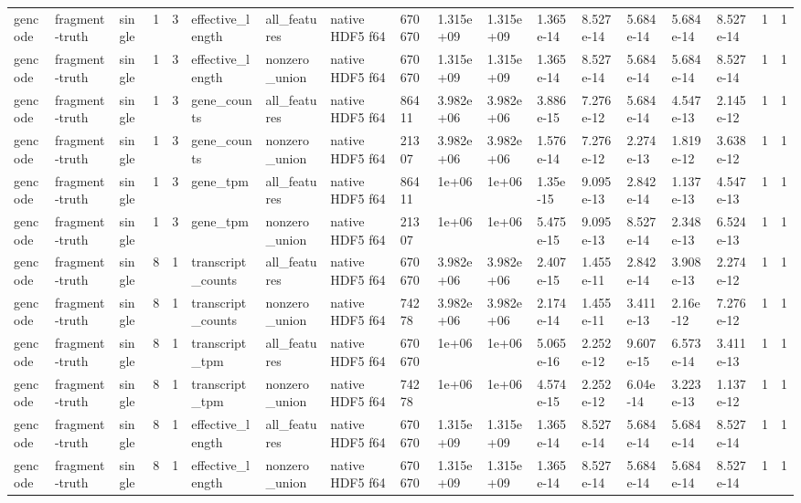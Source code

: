 \begin{tabular}{llllllllllllllllll}
gencode & fragment-truth & single & 1 & 3 & effective\_length & all\_features & native HDF5 f64 & 670670 & 1.315e+09 & 1.315e+09 & 1.365e-14 & 8.527e-14 & 5.684e-14 & 5.684e-14 & 8.527e-14 & 1 & 1 \\
gencode & fragment-truth & single & 1 & 3 & effective\_length & nonzero\_union & native HDF5 f64 & 670670 & 1.315e+09 & 1.315e+09 & 1.365e-14 & 8.527e-14 & 5.684e-14 & 5.684e-14 & 8.527e-14 & 1 & 1 \\
gencode & fragment-truth & single & 1 & 3 & gene\_counts & all\_features & native HDF5 f64 & 86411 & 3.982e+06 & 3.982e+06 & 3.886e-15 & 7.276e-12 & 5.684e-14 & 4.547e-13 & 2.145e-12 & 1 & 1 \\
gencode & fragment-truth & single & 1 & 3 & gene\_counts & nonzero\_union & native HDF5 f64 & 21307 & 3.982e+06 & 3.982e+06 & 1.576e-14 & 7.276e-12 & 2.274e-13 & 1.819e-12 & 3.638e-12 & 1 & 1 \\
gencode & fragment-truth & single & 1 & 3 & gene\_tpm & all\_features & native HDF5 f64 & 86411 & 1e+06 & 1e+06 & 1.35e-15 & 9.095e-13 & 2.842e-14 & 1.137e-13 & 4.547e-13 & 1 & 1 \\
gencode & fragment-truth & single & 1 & 3 & gene\_tpm & nonzero\_union & native HDF5 f64 & 21307 & 1e+06 & 1e+06 & 5.475e-15 & 9.095e-13 & 8.527e-14 & 2.348e-13 & 6.524e-13 & 1 & 1 \\
gencode & fragment-truth & single & 8 & 1 & transcript\_counts & all\_features & native HDF5 f64 & 670670 & 3.982e+06 & 3.982e+06 & 2.407e-15 & 1.455e-11 & 2.842e-14 & 3.908e-13 & 2.274e-12 & 1 & 1 \\
gencode & fragment-truth & single & 8 & 1 & transcript\_counts & nonzero\_union & native HDF5 f64 & 74278 & 3.982e+06 & 3.982e+06 & 2.174e-14 & 1.455e-11 & 3.411e-13 & 2.16e-12 & 7.276e-12 & 1 & 1 \\
gencode & fragment-truth & single & 8 & 1 & transcript\_tpm & all\_features & native HDF5 f64 & 670670 & 1e+06 & 1e+06 & 5.065e-16 & 2.252e-12 & 9.607e-15 & 6.573e-14 & 3.411e-13 & 1 & 1 \\
gencode & fragment-truth & single & 8 & 1 & transcript\_tpm & nonzero\_union & native HDF5 f64 & 74278 & 1e+06 & 1e+06 & 4.574e-15 & 2.252e-12 & 6.04e-14 & 3.223e-13 & 1.137e-12 & 1 & 1 \\
gencode & fragment-truth & single & 8 & 1 & effective\_length & all\_features & native HDF5 f64 & 670670 & 1.315e+09 & 1.315e+09 & 1.365e-14 & 8.527e-14 & 5.684e-14 & 5.684e-14 & 8.527e-14 & 1 & 1 \\
gencode & fragment-truth & single & 8 & 1 & effective\_length & nonzero\_union & native HDF5 f64 & 670670 & 1.315e+09 & 1.315e+09 & 1.365e-14 & 8.527e-14 & 5.684e-14 & 5.684e-14 & 8.527e-14 & 1 & 1 \\

\end{tabular}

